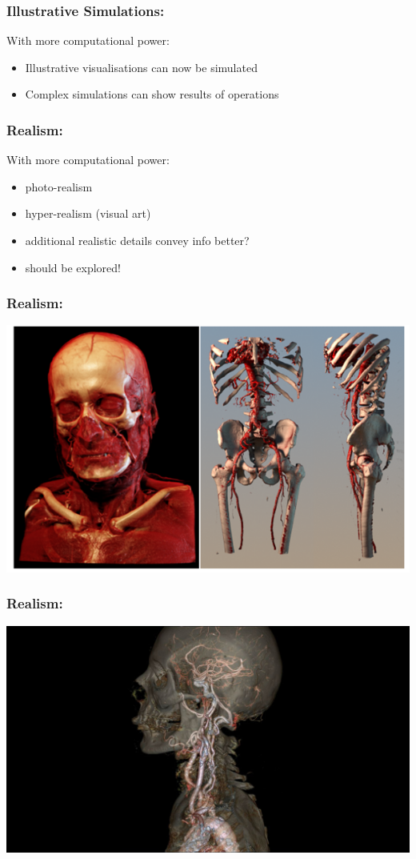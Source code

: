 \documentclass{beamer}
\begin{document}
\begin{frame}
	\frametitle{Illustrative Simulations:}
		With more computational power:
		\begin{itemize}
			\item Illustrative visualisations can now be simulated
			\item Complex simulations can show results of operations
		\end{itemize}
\end{frame}

\begin{frame}
	\frametitle{Realism:}
		With more computational power:
	\begin{itemize}
		\item photo-realism
		\item hyper-realism (visual art)
		\item additional realistic details convey info better?
		\item should be explored!
	\end{itemize}
\end{frame}

\begin{frame}
	\frametitle{Realism:}
	\includegraphics[width=\textwidth]{images/medical_visualisation}
\end{frame}

\begin{frame}
	\frametitle{Realism:}
	\includegraphics[width=\textwidth]{images/realistic_transparent}
\end{frame}
\end{document}
